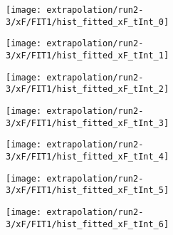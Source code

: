 \begin{figure}
\centering
\caption{Fit to the flask subtracted yield ratio with FIT1 for $x_F$ for run 2-3.}
\label{fig:run2-3_FIT1_xF}
\begin{subfigure}{0.45\linewidth}
\texttt{[image: extrapolation/run2-3/xF/FIT1/hist\_fitted\_xF\_tInt\_0]}
\end{subfigure}
\begin{subfigure}{0.45\linewidth}
\texttt{[image: extrapolation/run2-3/xF/FIT1/hist\_fitted\_xF\_tInt\_1]}
\end{subfigure}
\begin{subfigure}{0.45\linewidth}
\texttt{[image: extrapolation/run2-3/xF/FIT1/hist\_fitted\_xF\_tInt\_2]}
\end{subfigure}
\begin{subfigure}{0.45\linewidth}
\texttt{[image: extrapolation/run2-3/xF/FIT1/hist\_fitted\_xF\_tInt\_3]}
\end{subfigure}
\begin{subfigure}{0.45\linewidth}
\texttt{[image: extrapolation/run2-3/xF/FIT1/hist\_fitted\_xF\_tInt\_4]}
\end{subfigure}
\begin{subfigure}{0.45\linewidth}
\texttt{[image: extrapolation/run2-3/xF/FIT1/hist\_fitted\_xF\_tInt\_5]}
\end{subfigure}
\begin{subfigure}{0.45\linewidth}
\texttt{[image: extrapolation/run2-3/xF/FIT1/hist\_fitted\_xF\_tInt\_6]}
\end{subfigure}
\end{figure}
